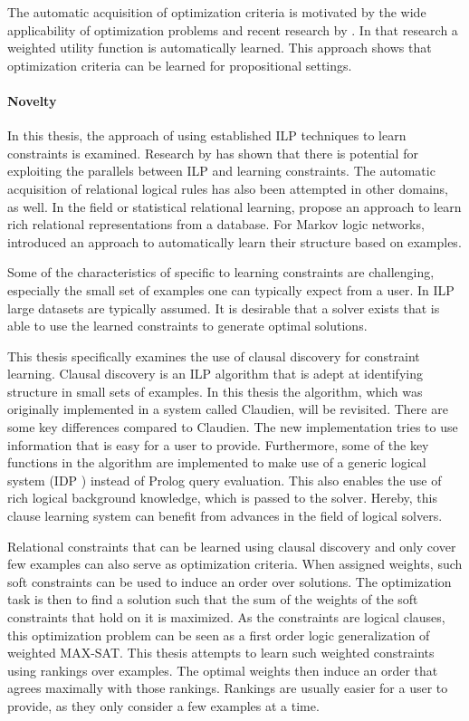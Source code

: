 The automatic acquisition of optimization criteria is motivated by the wide applicability of optimization problems and recent research by \cite{campigotto2011active}.
In that research a weighted utility function is automatically learned.
This approach shows that optimization criteria can be learned for propositional settings.

\paragraph{Novelty}
In this thesis, the approach of using established ILP techniques to learn constraints is examined. Research by \cite{Lallouet:LearningCP} has shown that there is potential for exploiting the parallels between ILP and learning constraints.
The automatic acquisition of relational logical rules has also been attempted in other domains, as well.
In the field or statistical relational learning, \cite{popescul2003statistical} propose an approach to learn rich relational representations from a database.
For Markov logic networks, \cite{kok2005learning} introduced an approach to automatically learn their structure based on examples.

Some of the characteristics of specific to learning constraints are challenging, especially the small set of examples one can typically expect from a user.
In ILP large datasets are typically assumed.
It is desirable that a solver exists that is able to use the learned constraints to generate optimal solutions.

This thesis specifically examines the use of clausal discovery \cite{DeRaedt:ClausalDiscovery} for constraint learning.
Clausal discovery is an ILP algorithm that is adept at identifying structure in small sets of examples. In this thesis the algorithm, which was originally implemented in a system called Claudien, will be revisited. There are some key differences compared to Claudien. The new implementation tries to use information that is easy for a user to provide. Furthermore, some of the key functions in the algorithm are implemented to make use of a generic logical system (IDP \cite{wittocx2008idp,de2013prototype}) instead of Prolog query evaluation. This also enables the use of rich logical background knowledge, which is passed to the solver. Hereby, this clause learning system can benefit from advances in the field of logical solvers.

Relational constraints that can be learned using clausal discovery and only cover few examples can also serve as optimization criteria.
When assigned weights, such soft constraints can be used to induce an order over solutions.
The optimization task is then to find a solution such that the sum of the weights of the soft constraints that hold on it is maximized.
As the constraints are logical clauses, this optimization problem can be seen as a first order logic generalization of weighted MAX-SAT.
This thesis attempts to learn such weighted constraints using rankings over examples.
The optimal weights then induce an order that agrees maximally with those rankings.
Rankings are usually easier for a user to provide, as they only consider a few examples at a time.


